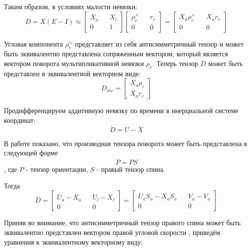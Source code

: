 \documentclass[a4paper]{article}
\begin{document}
Таким образом, в условиях малости невязки:
\begin{equation} D = X (E-I) \approx \begin{bmatrix}X_a&&X_l\\0&&1\end{bmatrix} \begin{bmatrix}\rho_e^\times&&r_e\\0&&0\end{bmatrix} = \begin{bmatrix}X_a\rho_e^\times&&X_ar_e\\0&&0\end{bmatrix} \end{equation}

Угловая компонента $\rho_e^\times$ представляет из себя антисимметричный тензор и может быть эквивалентно представлена сопряженным вектором, который является вектором поворота мультипликативной невязки $\rho_e$.  Теперь тензор $D$ может быть представлен в эквивалентной векторном виде:
\begin{equation} D_{vec} = \begin{bmatrix}X_a\rho_e\\X_ar_e\end{bmatrix} \end{equation}

Продифференцируем аддитивную невязку по времени в инерциальной системе координат:
\begin{equation} \dot{D} = \dot{U} -\dot{X} \end{equation}

В работе \cite{zhilin} показано, что производная тензора поворота может быть представлена в следующей форме
\begin{equation} \dot{P} = P S \end{equation}
, где $P$ - тензор ориентации, $S$ - правый тензор спина.

Тогда 
\begin{equation} 
\dot{D} = \begin{bmatrix}\dot{U_a} - \dot{X_a}&&\dot{U}_l-\dot{X}_l\\0&&0\end{bmatrix} 
= \begin{bmatrix}U_aS_u - X_aS_x&&V_u-V_x\\0&&0\end{bmatrix}\end{equation}

Приняв во внимание, что антисимметричный тензор правого спина может быть эквивалентно представлен вектором правой угловой скорости \cite{zhilin}, приведём уравнения к эквивалентному векторному виду:
\end{document}

